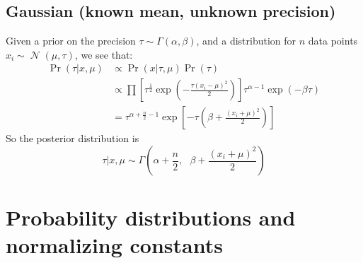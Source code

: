 \documentclass[12pt]{report}
\DeclareMathOperator{\N}{\mathcal{N}}
\begin{document}
\section{Gaussian (known mean, unknown precision)}
\label{sec:conj:gaussianwithmean}

Given a prior on the precision $\tau \sim \Gamma(\alpha, \beta)$, and a distribution for $n$ data points $x_i \sim \N(\mu, \tau)$, we see that: \begin{align*}
\Pr(\tau | x, \mu) &\propto \Pr(x | \tau, \mu)\Pr(\tau) \\
&\propto \prod\left[\tau^{\frac{1}{2}}\exp\left(  -\frac{\tau(x_i - \mu)^2}{2}  \right)\right] \tau^{\alpha-1}\exp(-\beta\tau) \\
&= \tau^{\alpha + \frac{n}{2} - 1}\exp\left[  -\tau\left(\beta + \frac{(x_i + \mu)^2}{2}\right)  \right]
\end{align*}
So the posterior distribution is \[
\tau | x, \mu \sim \Gamma\left(  \alpha + \frac{n}{2}, \text{ } \beta + \frac{(x_i + \mu)^2}{2}  \right)
\]

\chapter{Probability distributions and normalizing constants}


\end{document}
